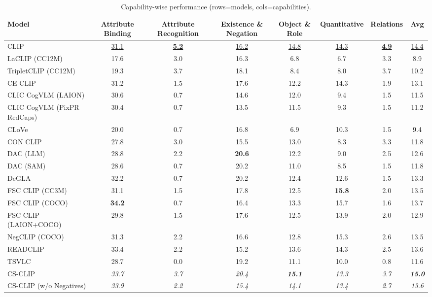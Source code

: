 \begin{table}[t]
  \centering
  \scriptsize
  \caption{Capability-wise performance (rows=models, cols=capabilities).}
  \label{tab:caps_models_rows}
  \begin{adjustbox}{max width=\textwidth}
  \setlength{\tabcolsep}{2pt}
  \begin{tabular}{p{5.0cm}ccccccc}
    \toprule
    Model & Attribute Binding & Attribute Recognition & Existence \& Negation & Object \& Role & Quantitative & Relations & Avg \\
    \midrule
    CLIP & \underline{31.1} & \textbf{\underline{5.2}} & \underline{16.2} & \underline{14.8} & \underline{14.3} & \textbf{\underline{4.9}} & \underline{14.4} \\
    \midrule
    LaCLIP (CC12M) & 17.6 & 3.0 & 16.3 & 6.8 & 6.7 & 3.3 & 8.9 \\
    TripletCLIP (CC12M) & 19.3 & 3.7 & 18.1 & 8.4 & 8.0 & 3.7 & 10.2 \\
    \midrule
    CE CLIP & 31.2 & 1.5 & 17.6 & 12.2 & 14.3 & 1.9 & 13.1 \\
    CLIC CogVLM (LAION) & 30.6 & 0.7 & 14.6 & 12.0 & 9.4 & 1.5 & 11.5 \\
    CLIC CogVLM (PixPR RedCaps) & 30.4 & 0.7 & 13.5 & 11.5 & 9.3 & 1.5 & 11.2 \\
    CLoVe & 20.0 & 0.7 & 16.8 & 6.9 & 10.3 & 1.5 & 9.4 \\
    CON CLIP & 27.8 & 3.0 & 15.5 & 13.0 & 8.3 & 3.3 & 11.8 \\
    DAC (LLM) & 28.8 & 2.2 & \textbf{20.6} & 12.2 & 9.0 & 2.5 & 12.6 \\
    DAC (SAM) & 28.6 & 0.7 & 20.2 & 11.0 & 8.5 & 1.5 & 11.8 \\
    DeGLA & 32.2 & 0.7 & 20.2 & 12.4 & 12.6 & 1.5 & 13.3 \\
    FSC CLIP (CC3M) & 31.1 & 1.5 & 17.8 & 12.5 & \textbf{15.8} & 2.0 & 13.5 \\
    FSC CLIP (COCO) & \textbf{34.2} & 0.7 & 16.4 & 13.3 & 15.7 & 1.6 & 13.7 \\
    FSC CLIP (LAION+COCO) & 29.8 & 1.5 & 17.6 & 12.5 & 13.9 & 2.0 & 12.9 \\
    NegCLIP (COCO) & 31.3 & 2.2 & 16.6 & 12.8 & 15.3 & 2.6 & 13.5 \\
    READCLIP & 33.4 & 2.2 & 15.2 & 13.6 & 14.3 & 2.5 & 13.6 \\
    TSVLC & 28.7 & 0.0 & 19.2 & 11.1 & 10.0 & 0.8 & 11.6 \\
    \midrule
    CS-CLIP & \emph{33.7} & \emph{3.7} & \emph{20.4} & \textbf{\emph{15.1}} & \emph{13.3} & \emph{3.7} & \textbf{\emph{15.0}} \\
    CS-CLIP (w/o Negatives) & \emph{33.9} & \emph{2.2} & \emph{15.4} & \emph{14.1} & \emph{13.4} & \emph{2.7} & \emph{13.6} \\
    \bottomrule
  \end{tabular}
  \end{adjustbox}
\end{table}